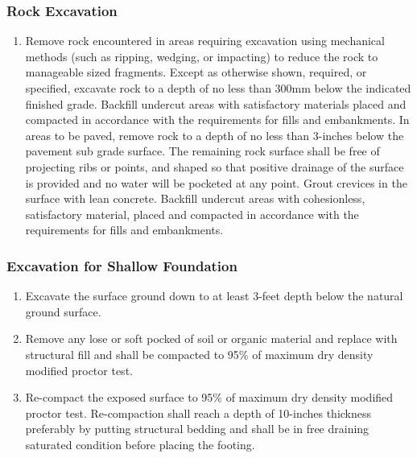 \documentclass{article}%
\begin{document}
\subsubsection{Rock Excavation}%
\label{ssubsec:RockExcavation}%
\begin{enumerate}[label=\alph*),start=1]%
\item%
Remove rock encountered in areas requiring excavation using mechanical methods (such as ripping, wedging, or impacting) to reduce the rock to manageable sized fragments. Except as otherwise shown, required, or specified, excavate rock to a depth of no less than 300mm below the indicated finished grade. Backfill undercut areas with satisfactory materials placed and compacted in accordance with the requirements for fills and embankments. In areas to be paved, remove rock to a depth of no less than 3{-}inches below the pavement sub grade surface. The remaining rock surface shall be free of projecting ribs or points, and shaped so that positive drainage of the surface is provided and no water will be pocketed at any point. Grout crevices in the surface with lean concrete. Backfill undercut areas with cohesionless, satisfactory material, placed and compacted in accordance with the requirements for fills and embankments.%
\end{enumerate}

%
\subsubsection{Excavation for Shallow Foundation}%
\label{ssubsec:ExcavationforShallowFoundation}%
\begin{enumerate}[label=\alph*),start=1]%
\item%
Excavate the surface ground down to at least 3{-}feet depth below the natural ground surface.%
\item%
Remove any lose or soft pocked of soil or organic material and replace with structural fill and shall be compacted to 95\% of maximum dry density modified proctor test.%
\item%
Re{-}compact the  exposed  surface  to  95\%  of maximum  dry density modified proctor test. Re{-}compaction shall reach a depth of 10{-}inches thickness preferably by putting structural bedding and shall be in free draining saturated condition before placing the footing.%
\end{enumerate}

%
\end{document}
